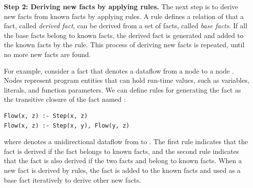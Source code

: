 
\smallskip
\textbf{Step 2: Deriving new facts by applying rules.}
The next step is to derive new facts from known facts by applying rules.
A rule defines a relation of that a fact, called {\it derived fact}, can be derived from a
set of facts, called {\it base facts}. 
If all the base facts belong to known facts, the derived fact is generated and
added to the known facts by the rule.
This process of deriving new facts is repeated, until no more new facts are
found.


For example, consider a fact  that denotes a dataflow from a
node  to a node . 
Nodes represent program entities that can hold run-time values, such as
variables, literals, and function parameters.  
We can define rules for generating the fact as the transitive closure of the
fact named :

\begin{lstlisting}[style=mrule]
Flow(x, z) :- Step(x, z)
Flow(x, z) :- Step(x, y), Flow(y, z)
\end{lstlisting}

\noindent
where  denotes a unidirectional dataflow from  to
. 
The first rule indicates that the fact  is derived if the
fact  belongs to known facts, and the second rule indicates
that the fact  is also derived if the two facts  and  belong to known facts.
When a new fact is derived by rules, the fact is added to the known facts and
used as a base fact iteratively to derive other new facts.

